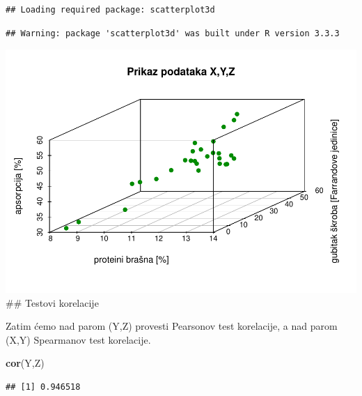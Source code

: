 \documentclass[]{article}
\newenvironment{Shaded}{\begin{snugshade}}{\end{snugshade}}
\newcommand{\KeywordTok}[1]{\textcolor[rgb]{0.13,0.29,0.53}{\textbf{{#1}}}}
\newcommand{\DataTypeTok}[1]{\textcolor[rgb]{0.13,0.29,0.53}{{#1}}}
\newcommand{\DecValTok}[1]{\textcolor[rgb]{0.00,0.00,0.81}{{#1}}}
\newcommand{\StringTok}[1]{\textcolor[rgb]{0.31,0.60,0.02}{{#1}}}
\newcommand{\NormalTok}[1]{{#1}}
\begin{document}
\begin{verbatim}
## Loading required package: scatterplot3d
\end{verbatim}

\begin{verbatim}
## Warning: package 'scatterplot3d' was built under R version 3.3.3
\end{verbatim}

\begin{Shaded}
\end{Shaded}

\includegraphics{Izvjestaj_files/figure-latex/unnamed-chunk-24-4.pdf}
\#\# Testovi korelacije

Zatim ćemo nad parom (Y,Z) provesti Pearsonov test korelacije, a nad
parom (X,Y) Spearmanov test korelacije.

\begin{Shaded}
\begin{Highlighting}[]
\KeywordTok{cor}\NormalTok{(Y,Z)}
\end{Highlighting}
\end{Shaded}

\begin{verbatim}
## [1] 0.946518
\end{verbatim}
\end{document}
